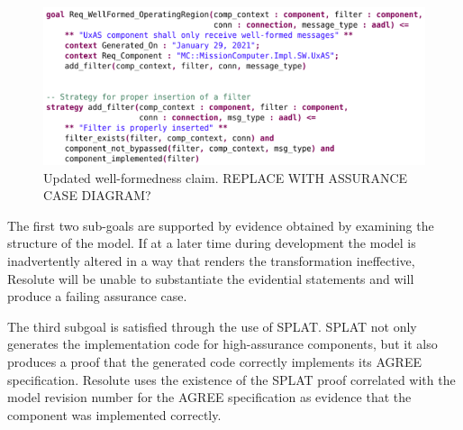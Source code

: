 \begin{figure}[h] 
\centering 
\includegraphics[width=1\columnwidth]{figs/resolute-add-filter.png}
\caption{Updated well-formedness claim. REPLACE WITH ASSURANCE CASE DIAGRAM?}
\label{fig:resolute-add-filter} \end{figure}

The first two sub-goals are supported by evidence obtained by examining the structure of the model. 
If at a later time during development the model is inadvertently altered in a way that renders the transformation
ineffective, Resolute will be unable to substantiate the evidential statements and will
produce a failing assurance case.

The third subgoal is satisfied through the use of SPLAT. SPLAT not only generates the implementation code for
high-assurance components, but it also produces a proof that the generated code correctly 
implements its AGREE specification. Resolute uses the existence of the
SPLAT proof correlated with the model revision number for the AGREE specification
as evidence that the component was implemented correctly.





